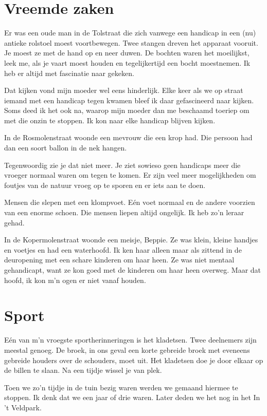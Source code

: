 \documentclass[10pt,twoside,openright]{memoir}
\begin{document}
\chapter{Vreemde zaken} %
\label{cha:vreemde_zaken}

Er was een oude man in de Tolstraat die zich vanwege een handicap in een (nu) antieke rolstoel moest voortbewegen. Twee stangen dreven het apparaat vooruit. Je moest ze met de hand op en neer duwen. De bochten waren het moeilijkst, leek me, als je vaart moest houden en tegelijkertijd een bocht moestnemen. Ik heb er altijd met fascinatie naar gekeken. 

Dat kijken vond mijn moeder wel eens hinderlijk. Elke keer als we op straat iemand met een handicap tegen kwamen bleef ik daar gefascineerd naar kijken. Soms deed ik het ook na, waarop mijn moeder dan me beschaamd toeriep om met die onzin te stoppen. Ik kon naar elke handicap blijven kijken.

In de Rosmolenstraat woonde een mevrouw die een krop had. Die persoon had dan een soort ballon in de nek hangen. 

Tegenwoordig zie je dat niet meer. Je ziet sowieso geen handicaps meer die vroeger normaal waren om tegen te komen. Er zijn veel meer mogelijkheden om foutjes van de natuur vroeg op te sporen en er iets aan te doen.

Mensen die slepen met een klompvoet. Eén voet normaal en de andere voorzien van een enorme schoen. Die mensen liepen altijd ongelijk. Ik heb zo’n leraar gehad.

In de Kopermolenstraat woonde een meisje, Beppie. Ze was klein, kleine handjes en voetjes en had een waterhoofd. Ik ken haar alleen maar als zittend in de deuropening met een schare kinderen om haar heen. Ze was niet mentaal gehandicapt, want ze kon goed met de kinderen om haar heen overweg. Maar dat hoofd, ik kon m’n ogen er niet vanaf houden.

\chapter{Sport} %
\label{cha:sport}

Eén van m’n vroegste sportherinneringen is het kladetsen. Twee deelnemers zijn meestal genoeg. De broek, in ons geval een korte gebreide broek met eveneens gebreide houders over de schouders, moet uit. Het kladetsen doe je door elkaar op de billen te slaan. Na een tijdje wissel je van plek. 

Toen we zo’n tijdje in de tuin bezig waren werden we gemaand hiermee te stoppen. Ik denk dat we een jaar of drie waren. Later deden we het nog in het In ’t Veldpark.
\end{document}
